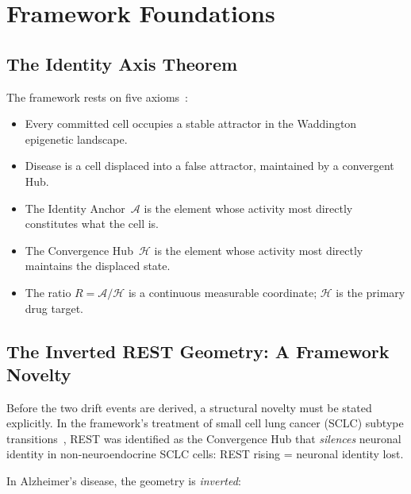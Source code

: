 \documentclass[12pt,a4paper]{article}
\newcommand{\IA}{\mathcal{A}}
\newcommand{\Hub}{\mathcal{H}}
\begin{document}
\section{Framework Foundations}

\subsection{The Identity Axis Theorem}

The framework rests on five axioms~\cite{IAT2026}:
\begin{itemize}
  \item Every committed cell occupies a stable attractor
    in the Waddington epigenetic landscape.
  \item Disease is a cell displaced into a false attractor,
    maintained by a convergent Hub.
  \item The Identity Anchor~$\IA$ is the element whose
    activity most directly constitutes what the cell is.
  \item The Convergence Hub~$\Hub$ is the element whose
    activity most directly maintains the displaced state.
  \item The ratio $R = \IA/\Hub$ is a continuous measurable
    coordinate; $\Hub$ is the primary drug target.
\end{itemize}

\subsection{The Inverted REST Geometry: A Framework
Novelty}

Before the two drift events are derived, a structural
novelty must be stated explicitly. In the framework's
treatment of small cell lung cancer (SCLC) subtype
transitions~\cite{IAT2026}, REST was identified as the
Convergence Hub that \emph{silences} neuronal identity
in non-neuroendocrine SCLC cells: REST rising = neuronal
identity lost.

In Alzheimer's disease, the geometry is \emph{inverted}:
\end{document}
